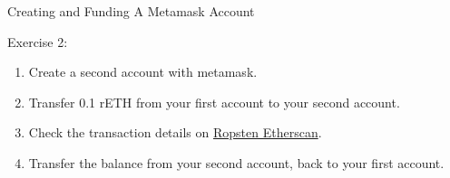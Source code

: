\documentclass[handout]{beamer}
\begin{document}
\begin{frame}{Creating and Funding A Metamask Account}

	\begin{exercise}{Exercise 2:}
		\begin{enumerate}
			\item Create a second account with metamask.
			\item Transfer 0.1 rETH from your first account to your second account.
			\item Check the transaction details on \link \href{https://ropsten.etherscan.io/}{Ropsten Etherscan}.
			\item Transfer the balance from your second account, back to your first account. 
		\end{enumerate}
	\end{exercise}	
\end{frame}
\end{document}
